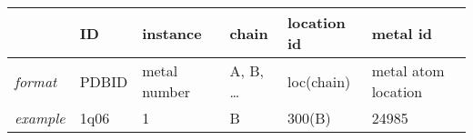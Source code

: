 \begin{tabular}{llllll}
  \toprule
  & ID & instance & chain & location id & metal id \\
  \midrule
  \textit{format} & PDBID & metal number & A, B, \ldots & loc(chain) & metal atom location \\
  \textit{example} & 1q06 & 1 & B & 300(B) & 24985 \\
  \bottomrule
\end{tabular}
